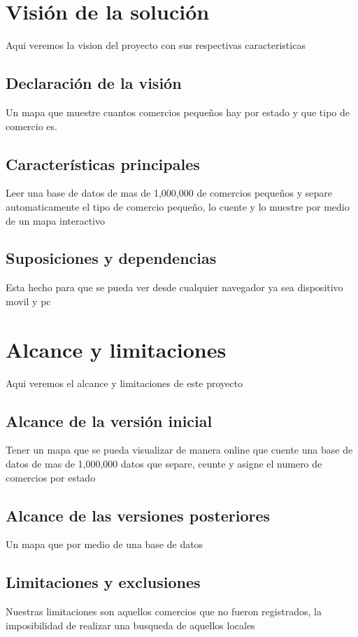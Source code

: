 \documentclass[12pt]{article}
\begin{document}
\newpage
\maketitle

\newpage \tableofcontents

\newpage \section{Visión de la solución}

Aqui veremos la vision del proyecto con sus respectivas caracteristicas
 
\subsection{Declaración de la visión}\label{ant}

Un mapa que muestre cuantos comercios pequeños hay por estado y que tipo de comercio es.

\subsection{Características principales}\label{on}

Leer una base de datos de mas de 1,000,000 de comercios pequeños y separe automaticamente el tipo de comercio pequeño, lo cuente y lo muestre por medio de un mapa interactivo

\subsection{Suposiciones y dependencias}\label{occe}

Esta hecho para que se pueda ver desde cualquier navegador ya sea dispositivo movil y pc

\section{Alcance y limitaciones}

Aqui veremos el alcance y limitaciones de este proyecto
 
\subsection{Alcance de la versión inicial}\label{ant}

Tener un mapa que se pueda visualizar de manera online que cuente una base de datos de mas de 1,000,000 datos que separe, ceunte y asigne el numero de comercios por estado

\subsection{Alcance de las versiones posteriores}\label{on}

Un mapa que por medio de una base de datos 

\subsection{Limitaciones y exclusiones}\label{occe}

Nuestras limitaciones son aquellos comercios que no fueron registrados, la imposibilidad de realizar una busqueda de aquellos locales 
\end{document}
